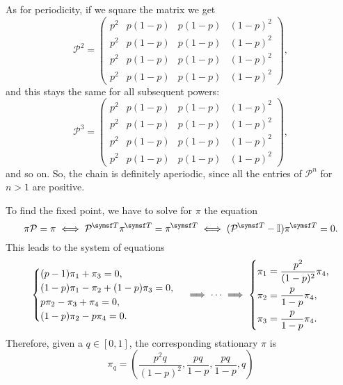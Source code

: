 As for periodicity, if we square the matrix we get
\begin{equation}
    \mathcal{P}^{2} =
    \begin{pmatrix}
        p^{2} & p(1-p) & p(1-p) & (1-p)^{2} \\
        p^{2} & p(1-p) & p(1-p) & (1-p)^{2} \\
        p^{2} & p(1-p) & p(1-p) & (1-p)^{2} \\
        p^{2} & p(1-p) & p(1-p) & (1-p)^{2}
    \end{pmatrix},
\end{equation}
and this stays the same for all subsequent powers:
\begin{equation}
    \mathcal{P}^{3} =
    \begin{pmatrix}
        p^{2} & p(1-p) & p(1-p) & (1-p)^{2} \\
        p^{2} & p(1-p) & p(1-p) & (1-p)^{2} \\
        p^{2} & p(1-p) & p(1-p) & (1-p)^{2} \\
        p^{2} & p(1-p) & p(1-p) & (1-p)^{2}
    \end{pmatrix},
\end{equation}
and so on. So, the chain is definitely aperiodic, since all the entries of
$\mathcal{P}^{n}$ for $n > 1$ are positive.

To find the fixed point, we have to solve for $\pi$ the equation
\begin{equation}
    \pi \mathcal{P} = \pi \iff \mathcal{P}\tran \pi\tran = \pi\tran
    \iff (\mathcal{P}\tran - \I) \pi\tran = 0.
\end{equation}
This leads to the system of equations
\begin{equation}
    \begin{cases}
        (p-1)\pi_1 + \pi_3 = 0, \\
        (1-p)\pi_1 - \pi_2 +(1-p)\pi_3 = 0, \\
        p\pi_2 - \pi_3 + \pi_4 = 0, \\
        (1-p)\pi_2 - p\pi_4 = 0.
    \end{cases}
    \implies \dots \implies
    \begin{dcases}
        \pi_1 = \frac{p^{2}}{(1-p)^{2}}\pi_4, \\
        \pi_2 = \frac{p}{1-p}\pi_4, \\
        \pi_3 = \frac{p}{1-p}\pi_4.
    \end{dcases}
\end{equation}
Therefore, given a $q \in [0,1]$, the corresponding stationary $\pi$ is
\begin{equation}
    \pi_{q} = \left(\frac{p^{2}q}{(1-p)^{2}}, \frac{pq}{1-p}, \frac{pq}{1-p},
    q\right)
\end{equation}


